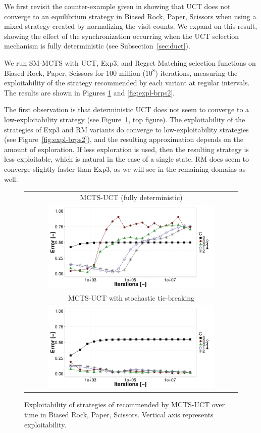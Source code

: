 We first revisit the counter-example given in \cite{Shafiei09} showing that
UCT does not converge to an equilibrium strategy in Biased Rock, Paper, Scissors
when using a mixed strategy created by normalizing the visit counts.
We expand on this result, showing the effect of the synchronization occurring when the UCT selection mechanism is fully deterministic (see Subsection~\ref{sec:duct}).

We run SM-MCTS with UCT, Exp3, and Regret Matching selection functions on Biased Rock, Paper, Scissors
for 100 million ($10^8$) iterations, measuring the exploitability of the strategy recommended by
each variant at regular intervals. The results are shown in Figures \ref{fig:expl-brps1} and \ref{fig:expl-brps2}.

The first observation is that deterministic UCT does not seem to converge to a low-exploitability strategy (see Figure~\ref{fig:expl-brps1}, top figure). The exploitability of the strategies of
Exp3 and RM variants do converge to low-exploitability strategies (see Figure~\ref{fig:expl-brps2}), and the resulting approximation depends on the amount of exploration.
If less exploration is used, then the resulting strategy is less exploitable, which is natural in the case of a single state. RM does seem to
converge slightly faster than Exp3, as we will see in the remaining domains as well.

\begin{figure}[t!]
\centering
\begin{tabular}{c}
{\small MCTS-UCT (fully deterministic)} \\
\includegraphics[width=0.8\textwidth]{figures/brps-MCTS-UCT.pdf} \\
{\small MCTS-UCT with stochastic tie-breaking} \\
\includegraphics[width=0.8\textwidth]{figures/brps-MCTS-UCT-NONDET.pdf} \\
\end{tabular}
\caption{Exploitability of strategies of recommended by MCTS-UCT over time in Biased Rock, Paper, Scissors. Vertical axis represents exploitability. }
\label{fig:expl-brps1}
\end{figure}

